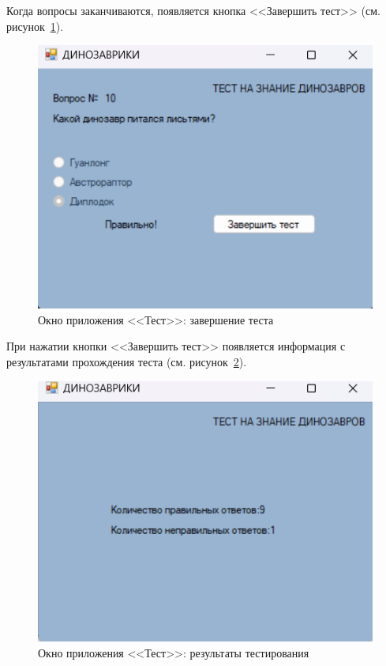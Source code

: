 \documentclass[bachelor, och, pract, times]{SCWorks}
\begin{document}
Когда вопросы заканчиваются, появляется кнопка <<Завершить тест>> (см. рисунок~\ref{fig:test-05}).

\begin{figure}[H]
    \centering
    \includegraphics[scale=0.7]{Скрины/Снимок экрана 2025-01-05 214141.png}
    \caption{Окно приложения <<Тест>>: завершение теста}\label{fig:test-05}
\end{figure}

При нажатии кнопки <<Завершить тест>> появляется информация с результатами прохождения теста (см. рисунок~\ref{fig:test-06}).

\begin{figure}[H]
    \centering
    \includegraphics[scale=0.7]{Скрины/Снимок экрана 2025-01-05 214040.png}
    \caption{Окно приложения <<Тест>>: результаты тестирования}\label{fig:test-06}
\end{figure}
\end{document}
